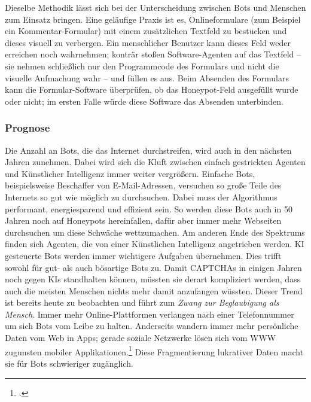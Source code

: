 Dieselbe Methodik lässt sich bei der Unterscheidung zwischen Bots und Menschen
zum Einsatz bringen. Eine geläufige Praxis ist es, Onlineformulare (zum
Beispiel ein Kommentar-Formular) mit einem zusätzlichen Textfeld zu bestücken
und dieses visuell zu verbergen. Ein menschlicher Benutzer kann dieses Feld
weder erreichen noch wahrnehmen; konträr stoßen Software-Agenten auf das
Textfeld -- sie nehmen schließlich nur den Programmcode des Formulars und nicht
die visuelle Aufmachung wahr -- und füllen es aus. Beim Absenden des Formulars
kann die Formular-Software überprüfen, ob das Honeypot-Feld ausgefüllt wurde
oder nicht; im ersten Falle würde diese Software das Absenden unterbinden.

\subsubsection{Prognose}
\label{ssub:prognose}

Die Anzahl an Bots, die das Internet durchstreifen, wird auch in den nächsten
Jahren zunehmen. Dabei wird sich die Kluft zwischen einfach gestrickten Agenten
und Künstlicher Intelligenz immer weiter vergrößern. Einfache Bots,
beispielsweise Beschaffer von E-Mail-Adressen, versuchen so große Teile des
Internets so gut wie möglich zu durchsuchen. Dabei muss der Algorithmus
performant, energiesparend und effizient sein. So werden diese Bots auch in 50
Jahren noch auf Honeypots hereinfallen, dafür aber immer mehr Webseiten
durchsuchen um diese Schwäche wettzumachen. Am anderen Ende des Spektrums
finden sich Agenten, die von einer Künstlichen Intelligenz angetrieben werden.
KI gesteuerte Bots werden immer wichtigere Aufgaben übernehmen. Dies trifft
sowohl für gut- als auch bösartige Bots zu. Damit CAPTCHAs in einigen Jahren
noch gegen KIs standhalten können, müssten sie derart kompliziert werden, dass
auch die meisten Menschen nichts mehr damit anzufangen wüssten. Dieser Trend
ist bereits heute zu beobachten und führt zum \emph{Zwang zur Beglaubigung als
Mensch}. Immer mehr Online-Plattformen verlangen nach einer Telefonnummer um
sich Bots vom Leibe zu halten. Anderseits wandern immer mehr persönliche Daten
vom Web in Apps; gerade soziale Netzwerke lösen sich vom WWW zugunsten mobiler
Applikationen.\footcite{timeOnSmartphone} Diese Fragmentierung lukrativer Daten
macht sie für Bots schwieriger zugänglich.
